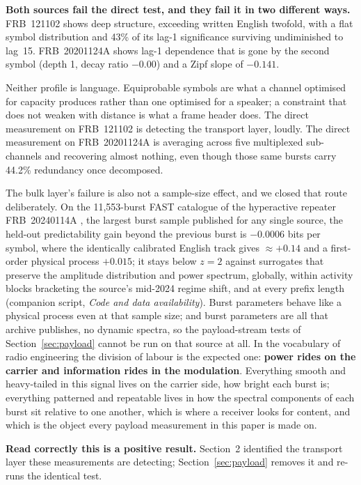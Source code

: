 \documentclass[11pt,a4paper]{article}
\begin{document}
\textbf{Both sources fail the direct test, and they fail it in two different ways.}
FRB~121102 shows deep structure, exceeding written English twofold, with a flat symbol
distribution and 43\% of its lag-1 significance surviving undiminished to lag~15.
FRB~20201124A shows lag-1 dependence that is gone by the second symbol (depth 1, decay
ratio $-0.00$) and a Zipf slope of $-0.141$.

Neither profile is language. Equiprobable symbols are what a channel optimised for
capacity produces rather than one optimised for a speaker; a constraint that does not
weaken with distance is what a frame header does. The direct measurement on FRB~121102
is detecting the transport layer, loudly. The direct measurement on FRB~20201124A is
averaging across five multiplexed sub-channels and recovering almost nothing, even
though those same bursts carry 44.2\% redundancy once decomposed.

The bulk layer's failure is also not a sample-size effect, and we closed that route
deliberately. On the 11{,}553-burst FAST catalogue of the hyperactive repeater
FRB~20240114A \cite{zhangjs2025}, the largest burst sample published for any single
source, the held-out predictability gain beyond the previous burst is $-0.0006$ bits
per symbol, where the identically calibrated English track gives $\approx +0.14$ and a
first-order physical process $+0.015$; it stays below $z = 2$ against surrogates that
preserve the amplitude distribution and power spectrum, globally, within activity
blocks bracketing the source's mid-2024 regime shift, and at every prefix length
(companion script, \emph{Code and data availability}). Burst parameters behave like a
physical process even at that sample size; and burst parameters are all that archive
publishes, no dynamic spectra, so the payload-stream tests of
Section~\ref{sec:payload} cannot be run on that source at all. In the vocabulary of radio engineering the
division of labour is the expected one: \textbf{power rides on the carrier and
information rides in the modulation}. Everything smooth and heavy-tailed in this
signal lives on the carrier side, how bright each burst is; everything patterned and
repeatable lives in how the spectral components of each burst sit relative to one
another, which is where a receiver looks for content, and which is the object every
payload measurement in this paper is made on.

\textbf{Read correctly this is a positive result.} Section~2 identified the transport
layer these measurements are detecting; Section~\ref{sec:payload} removes it and
re-runs the identical test.
\end{document}
